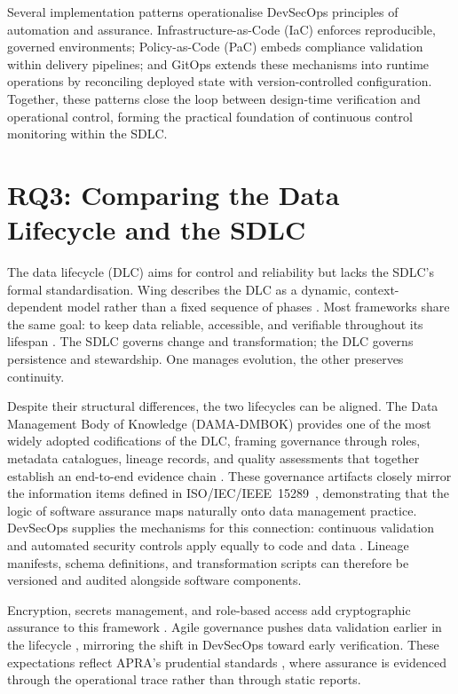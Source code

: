Several implementation patterns operationalise DevSecOps principles of
automation and assurance. Infrastructure-as-Code (IaC) enforces reproducible,
governed environments; Policy-as-Code (PaC) embeds compliance validation within
delivery pipelines; and GitOps extends these mechanisms into runtime operations
by reconciling deployed state with version-controlled configuration. Together,
these patterns close the loop between design-time verification and operational
control, forming the practical foundation of continuous control monitoring
within the SDLC.

\section{RQ3: Comparing the Data Lifecycle and the SDLC}

The data lifecycle (DLC) aims for control and reliability but lacks the SDLC’s
formal standardisation. Wing describes the DLC as a dynamic, context-dependent
model rather than a fixed sequence of phases \cite{wing_data_2019}. Most
frameworks share the same goal: to keep data reliable, accessible, and
verifiable throughout its lifespan \cite{ball_review_2012, lenhardt_data_2014}.
The SDLC governs change and transformation; the DLC governs persistence and
stewardship. One manages evolution, the other preserves continuity.

Despite their structural differences, the two lifecycles can be aligned. The
Data Management Body of Knowledge (DAMA-DMBOK) provides one of the most widely
adopted codifications of the DLC, framing governance through roles, metadata
catalogues, lineage records, and quality assessments that together establish an
end-to-end evidence chain \cite{cupoli_dama-dmbok2_nodate}. These governance
artifacts closely mirror the information items defined in
ISO/IEC/IEEE~15289~\cite{noauthor_isoiecieee_2019}, demonstrating that the logic
of software assurance maps naturally onto data management practice. DevSecOps
supplies the mechanisms for this connection: continuous validation and automated
security controls apply equally to code and data
\cite{souppaya_secure_2022, anisetti_devsecops-based_2022}. Lineage manifests,
schema definitions, and transformation scripts can therefore be versioned and
audited alongside software components.

Encryption, secrets management, and role-based access add cryptographic
assurance to this framework \cite{elbaghazaoui_safeguarding_2025,
elbaghazaoui_integrating_2025}. Agile governance pushes data validation earlier
in the lifecycle \cite{elbaghazaoui_agility_2025,
elbaghazaoui_metadata_2025, elbaghazaoui_data_2025-1}, mirroring the shift in
DevSecOps toward early verification. These expectations reflect APRA’s
prudential standards \cite{australian_prudential_regulation_authority_prudential_2013,
cps234, cps230, cps510}, where assurance is evidenced through the operational
trace rather than through static reports.


